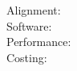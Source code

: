 \vspace*{2mm}
\noindent Alignment:\\

\vspace*{2mm}
\noindent Software:\\

\vspace*{2mm}
\noindent Performance:\\

\vspace*{2mm}
\noindent Costing:\\

%




%
%
%
